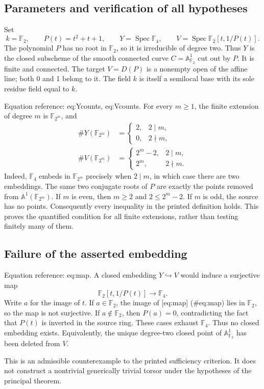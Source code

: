 \documentclass[10pt]{article}
\begin{document}
\subsection*{Parameters and verification of all hypotheses}
Set \[k=\mathbb F_2,\qquad P(t)=t^2+t+1,\qquad
 Y=\mathop{\mathrm{Spec}}\mathbb F_4,\qquad
 V=\mathop{\mathrm{Spec}}\mathbb F_2[t,1/P(t)].\] The polynomial \(P\) has no root in \(\mathbb F_2\), so it is irreducible of degree two. Thus \(Y\) is the closed subscheme of the smooth connected curve \(C=\mathbb A_{\mathbb F_2}^1\) cut out by \(P\). It is finite and connected. The target \(V=D(P)\) is a nonempty open of the affine line; both 0 and 1 belong to it. The field \(k\) is itself a semilocal base with its sole residue field equal to \(k\).\par
Equation reference: eq:Ycounts, eq:Vcounts. For every \(m\ge1\), the finite extension of degree \(m\) is \(\mathbb F_{2^m}\), and \[\begin{aligned}
 \#Y(\mathbb F_{2^m})&=
 \begin{cases}
 2,&2\mid m,\\
 0,&2\nmid m,
 \end{cases}
 \\
 \#V(\mathbb F_{2^m})&=
 \begin{cases}
 2^m-2,&2\mid m,\\
 2^m,&2\nmid m.
 \end{cases}
 \end{aligned}\] Indeed, \(\mathbb F_4\) embeds in \(\mathbb F_{2^m}\) precisely when \(2\mid m\), in which case there are two embeddings. The same two conjugate roots of \(P\) are exactly the points removed from \(\mathbb A^1(\mathbb F_{2^m})\). If \(m\) is even, then \(m\ge2\) and \(2\le2^m-2\). If \(m\) is odd, the source has no points. Consequently every inequality in the printed definition holds. This proves the quantified condition for all finite extensions, rather than testing finitely many of them.\par
\subsection*{Failure of the asserted embedding}
Equation reference: eq:map. A closed embedding \(Y\hookrightarrow V\) would induce a surjective map \[
 \mathbb F_2[t,1/P(t)]\longrightarrow\mathbb F_4.\] Write \(a\) for the image of \(t\). If \(a\in\mathbb F_2\), the image of [eq:map] (\#eq:map) lies in \(\mathbb F_2\), so the map is not surjective. If \(a\notin\mathbb F_2\), then \(P(a)=0\), contradicting the fact that \(P(t)\) is inverted in the source ring. These cases exhaust \(\mathbb F_4\). Thus no closed embedding exists. Equivalently, the unique degree-two closed point of \(\mathbb A_{\mathbb F_2}^1\) has been deleted from \(V\).\par
This is an admissible counterexample to the printed sufficiency criterion. It does not construct a nontrivial generically trivial torsor under the hypotheses of the principal theorem.\par
\end{document}
